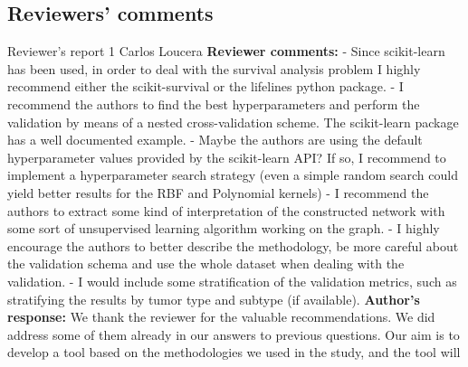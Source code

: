 \documentclass{bmcart}
\begin{document}
\begin{backmatter}
\section*{Reviewers' comments}
\newline Reviewer's report 1
\newline Carlos Loucera
\newline \textbf{Reviewer comments:}
- Since scikit-learn has been used, in order to deal with the survival analysis problem I highly recommend either the scikit-survival or the lifelines python package. 
- I recommend the authors to find the best hyperparameters and perform the validation by means of a nested cross-validation scheme. The scikit-learn package has a well documented example. 
- Maybe the authors are using the default hyperparameter values provided by the scikit-learn API? If so, I recommend to implement a hyperparameter search strategy (even a simple random search could yield better results for the RBF and Polynomial kernels) 
- I recommend the authors to extract some kind of interpretation of the constructed network with some sort of unsupervised learning algorithm working on the graph. 
- I highly encourage the authors to better describe the methodology, be more careful about the validation schema and use the whole dataset when dealing with the validation. 
- I would include some stratification of the validation metrics, such as stratifying the results by tumor type and subtype (if available).
\newline \textbf{Author's response:}
 We thank the reviewer for the valuable recommendations. We did address some of them already in our answers to previous questions. Our aim is to develop a tool based on the methodologies we used in the study, and the tool will 



\end{backmatter}
\end{document}
